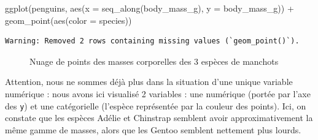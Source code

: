 \documentclass[
  a4paper,
  DIV=11,
  numbers=noendperiod,
  oneside]{scrreprt}
\newenvironment{Shaded}{}{}
\newcommand{\AttributeTok}[1]{\textcolor[rgb]{0.84,0.23,0.29}{#1}}
\newcommand{\FunctionTok}[1]{\textcolor[rgb]{0.44,0.26,0.76}{#1}}
\newcommand{\NormalTok}[1]{\textcolor[rgb]{0.14,0.16,0.18}{#1}}
\newcommand{\SpecialCharTok}[1]{\textcolor[rgb]{0.00,0.36,0.77}{#1}}
\begin{document}
\begin{Shaded}
\begin{Highlighting}[]
\FunctionTok{ggplot}\NormalTok{(penguins, }\FunctionTok{aes}\NormalTok{(}\AttributeTok{x =} \FunctionTok{seq\_along}\NormalTok{(body\_mass\_g), }\AttributeTok{y =}\NormalTok{ body\_mass\_g)) }\SpecialCharTok{+}
  \FunctionTok{geom\_point}\NormalTok{(}\FunctionTok{aes}\NormalTok{(}\AttributeTok{color =}\NormalTok{ species))}
\end{Highlighting}
\end{Shaded}

\begin{verbatim}
Warning: Removed 2 rows containing missing values (`geom_point()`).
\end{verbatim}

\begin{figure}[H]


\caption{\label{fig-cloud}Nuage de points des masses corporelles des 3
espèces de manchots}

\end{figure}%

Attention, nous ne sommes déjà plus dans la situation d'une unique
variable numérique : nous avons ici visualisé 2 variables : une
numérique (portée par l'axe des \texttt{y}) et une catégorielle
(l'espèce représentée par la couleur des points). Ici, on constate que
les espèces Adélie et Chinstrap semblent avoir approximativement la même
gamme de masses, alors que les Gentoo semblent nettement plus lourds.
\end{document}
